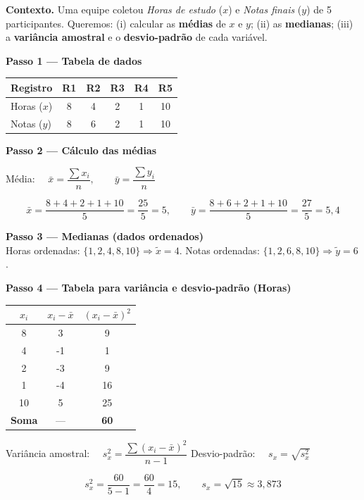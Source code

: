 \begin{SolvedBox}
\textbf{Contexto.} Uma equipe coletou \emph{Horas de estudo} ($x$) e \emph{Notas finais} ($y$) de 5 participantes. Queremos: (i) calcular as \textbf{médias} de $x$ e $y$; (ii) as \textbf{medianas}; (iii) a \textbf{variância amostral} e o \textbf{desvio-padrão} de cada variável.

\textbf{Passo 1 — Tabela de dados}\\[-6pt]
\begin{center}
\begin{tabular}{@{}lccccc@{}}\toprule
Registro & R1 & R2 & R3 & R4 & R5 \\\midrule
Horas ($x$) & 8 & 4 & 2 & 1 & 10 \\
Notas ($y$) & 8 & 6 & 2 & 1 & 10 \\\bottomrule
\end{tabular}
\end{center}

\textbf{Passo 2 — Cálculo das médias}

\begin{FormulaBox}
Média: $\quad \bar{x} = \dfrac{\sum x_i}{n}, \qquad \bar{y} = \dfrac{\sum y_i}{n}$
\end{FormulaBox}

\[
\bar{x} = \frac{8+4+2+1+10}{5} = \frac{25}{5} = 5,
\qquad
\bar{y} = \frac{8+6+2+1+10}{5} = \frac{27}{5} = 5{,}4
\]

\textbf{Passo 3 — Medianas (dados ordenados)}\\
Horas ordenadas: $\{1,2,4,8,10\} \Rightarrow \tilde{x}=4$. \quad
Notas ordenadas: $\{1,2,6,8,10\} \Rightarrow \tilde{y}=6$.

\textbf{Passo 4 — Tabela para variância e desvio-padrão (Horas)}

\begin{center}
\begin{tabular}{@{}c|c|c@{}}\toprule
$\,x_i\,$ & $x_i - \bar{x}$ & $(x_i - \bar{x})^2$ \\\midrule
8  & 3   & 9 \\
4  & -1  & 1 \\
2  & -3  & 9 \\
1  & -4  & 16 \\
10 & 5   & 25 \\\midrule
\textbf{Soma} & --- & \textbf{60} \\\bottomrule
\end{tabular}
\end{center}

\begin{FormulaBox}
Variância amostral: $\quad s_x^2 = \dfrac{\sum (x_i - \bar{x})^2}{n-1}$ \qquad
Desvio-padrão: $\quad s_x = \sqrt{s_x^2}$
\end{FormulaBox}

\[
s_x^2 = \frac{60}{5-1} = \frac{60}{4} = 15,
\qquad
s_x = \sqrt{15} \approx 3{,}873
\]
\end{SolvedBox}

